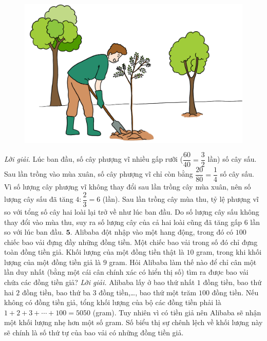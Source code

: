 \begin{multicols}{2}
	\begin{figure}[H]
		\centering
		\vspace*{-5pt}
		\captionsetup{labelformat= empty, justification=centering}
		\includegraphics[width=1\linewidth]{Pi6_bai4}
		\vspace*{-15pt}
	\end{figure}
	\textit{Lời giải.} Lúc ban đầu, số cây phượng vĩ nhiều gấp rưỡi ($\dfrac{60}{40}= \dfrac{3}{2}$ lần) số cây sấu. Sau lần trồng vào mùa xuân, số cây phượng vĩ chỉ còn bằng $\dfrac{20}{80}= \dfrac{1}{4}$ số cây sấu. Vì số lượng cây phượng vĩ không thay đổi sau lần trồng cây mùa xuân, nên số lượng cây sấu đã tăng $4:\dfrac{2}{3}=6$ (lần).
	\vskip 0.1cm
	Sau lần trồng cây mùa thu, tỷ lệ phượng vĩ so với tổng số cây hai loài lại trở về như lúc ban đầu. Do số lượng cây sấu không thay đổi vào mùa thu, suy ra số lượng cây của cả hai loài cũng đã tăng gấp $6$ lần so với lúc ban đầu.
	\vskip 0.1cm
	$\pmb{5.}$ Alibaba đột nhập vào một hang động, trong đó có $100$ chiếc bao vải đựng đầy những đồng tiền. Một chiếc bao vải trong số đó chỉ đựng toàn đồng tiền giả. Khối lượng của một đồng tiền thật là $10$ gram, trong khi khối lượng của một đồng tiền giả là $9$ gram. Hỏi Alibaba làm thế nào để chỉ cân một lần duy nhất (bằng một cái cân chính xác có hiển thị số) tìm ra được bao vải chứa các đồng tiền giả?
	\vskip 0.1cm
	\textit{Lời giải.} 	Alibaba lấy ở bao thứ nhất $1$ đồng tiền, bao thứ hai $2$ đồng tiền, bao thứ ba $3$ đồng tiền,\ldots, bao thứ một trăm $100$ đồng tiền. Nếu không có đồng tiền giả, tổng khối lượng của bộ các đồng tiền phải là $1+2+3+ \cdots+100=5050$ (gram). Tuy nhiên vì có tiền giả nên Alibaba sẽ nhận một khối lượng nhẹ hơn một số gram. Số biểu thị sự chênh lệch về khối lượng này sẽ chính là số thứ tự của bao vải có những đồng tiền giả.

\end{multicols}
